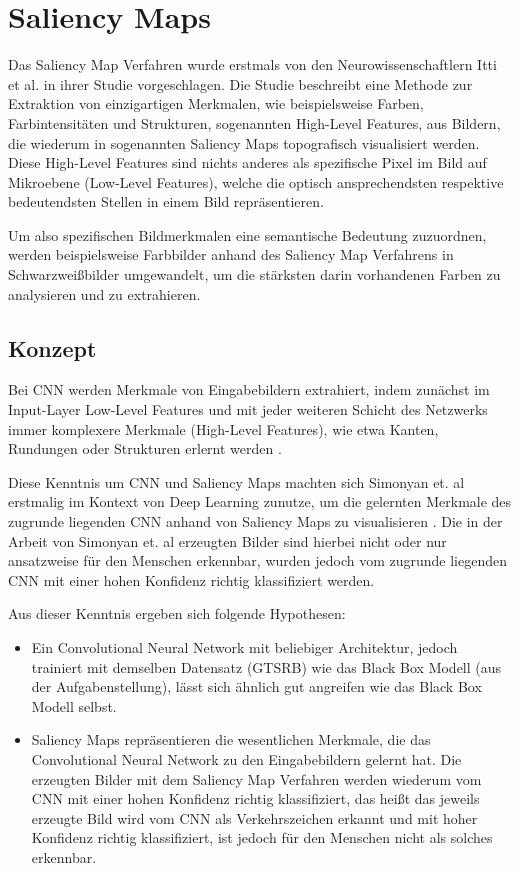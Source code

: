 \chapter{Saliency Maps}
\label{cha:saliency}
Das Saliency Map Verfahren wurde erstmals von den Neurowissenschaftlern Itti et al. \cite{itti_model_1998} in ihrer Studie vorgeschlagen. Die Studie beschreibt eine Methode zur Extraktion von einzigartigen Merkmalen, wie beispielsweise Farben, Farbintensitäten und Strukturen, sogenannten High-Level Features, aus Bildern, die wiederum in sogenannten Saliency Maps topografisch visualisiert werden. Diese High-Level Features sind nichts anderes als spezifische Pixel im Bild auf Mikroebene (Low-Level Features), welche die optisch ansprechendsten respektive bedeutendsten Stellen in einem Bild repräsentieren. 

Um also spezifischen Bildmerkmalen eine semantische Bedeutung zuzuordnen, werden beispielsweise Farbbilder anhand des Saliency Map Verfahrens in Schwarzweißbilder umgewandelt, um die stärksten darin vorhandenen Farben zu analysieren und zu extrahieren.

\section{Konzept}
Bei \ac{CNN} werden Merkmale von Eingabebildern extrahiert, indem zunächst im Input-Layer Low-Level Features und mit jeder weiteren Schicht des Netzwerks immer komplexere Merkmale (High-Level Features), wie etwa Kanten, Rundungen oder Strukturen erlernt werden \cite{stanford_unsupervised_tutorial}.

Diese Kenntnis um \ac{CNN} und Saliency Maps machten sich Simonyan et. al erstmalig im Kontext von Deep Learning zunutze, um die gelernten Merkmale des zugrunde liegenden \ac{CNN} anhand von Saliency Maps zu visualisieren \cite{simonyan_deep_2013}. 
Die in der Arbeit von Simonyan et. al erzeugten Bilder sind hierbei nicht oder nur ansatzweise für den Menschen erkennbar, wurden jedoch vom zugrunde liegenden \ac{CNN} mit einer hohen Konfidenz richtig klassifiziert werden.


Aus dieser Kenntnis ergeben sich folgende Hypothesen:
\begin{itemize}
	\item Ein Convolutional Neural Network mit beliebiger Architektur, jedoch trainiert mit demselben Datensatz (\ac{GTSRB}) wie das Black Box Modell (aus der Aufgabenstellung), lässt sich ähnlich gut angreifen wie das Black Box Modell selbst.
	\item 	Saliency Maps repräsentieren die wesentlichen Merkmale, die das Convolutional Neural Network zu den Eingabebildern gelernt hat. Die erzeugten Bilder mit dem Saliency Map Verfahren werden wiederum vom \ac{CNN} mit einer hohen Konfidenz richtig klassifiziert, das heißt das jeweils erzeugte Bild wird vom \ac{CNN} als Verkehrszeichen erkannt und mit hoher Konfidenz richtig klassifiziert, ist jedoch für den Menschen nicht als solches erkennbar.
\end{itemize}

